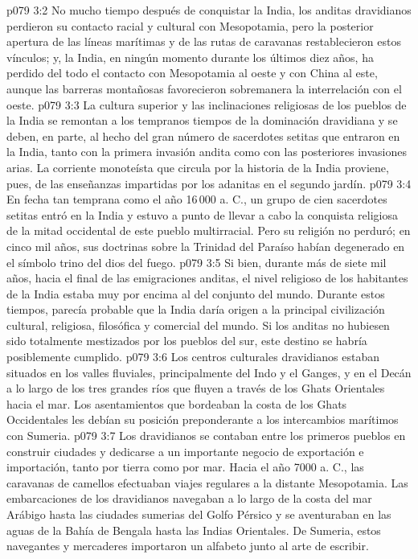 \vs p079 3:2 No mucho tiempo después de conquistar la India, los anditas dravidianos perdieron su contacto racial y cultural con Mesopotamia, pero la posterior apertura de las líneas marítimas y de las rutas de caravanas restablecieron estos vínculos; y, la India, en ningún momento durante los últimos diez años, ha perdido del todo el contacto con Mesopotamia al oeste y con China al este, aunque las barreras montañosas favorecieron sobremanera la interrelación con el oeste.
\vs p079 3:3 \pc La cultura superior y las inclinaciones religiosas de los pueblos de la India se remontan a los tempranos tiempos de la dominación dravidiana y se deben, en parte, al hecho del gran número de sacerdotes setitas que entraron en la India, tanto con la primera invasión andita como con las posteriores invasiones arias. La corriente monoteísta que circula por la historia de la India proviene, pues, de las enseñanzas impartidas por los adanitas en el segundo jardín.
\vs p079 3:4 En fecha tan temprana como el año 16\,000 a. C., un grupo de cien sacerdotes setitas entró en la India y estuvo a punto de llevar a cabo la conquista religiosa de la mitad occidental de este pueblo multirracial. Pero su religión no perduró; en cinco mil años, sus doctrinas sobre la Trinidad del Paraíso habían degenerado en el símbolo trino del dios del fuego.
\vs p079 3:5 Si bien, durante más de siete mil años, hacia el final de las emigraciones anditas, el nivel religioso de los habitantes de la India estaba muy por encima al del conjunto del mundo. Durante estos tiempos, parecía probable que la India daría origen a la principal civilización cultural, religiosa, filosófica y comercial del mundo. Si los anditas no hubiesen sido totalmente mestizados por los pueblos del sur, este destino se habría posiblemente cumplido.
\vs p079 3:6 \pc Los centros culturales dravidianos estaban situados en los valles fluviales, principalmente del Indo y el Ganges, y en el Decán a lo largo de los tres grandes ríos que fluyen a través de los Ghats Orientales hacia el mar. Los asentamientos que bordeaban la costa de los Ghats Occidentales les debían su posición preponderante a los intercambios marítimos con Sumeria.
\vs p079 3:7 Los dravidianos se contaban entre los primeros pueblos en construir ciudades y dedicarse a un importante negocio de exportación e importación, tanto por tierra como por mar. Hacia el año 7000 a. C., las caravanas de camellos efectuaban viajes regulares a la distante Mesopotamia. Las embarcaciones de los dravidianos navegaban a lo largo de la costa del mar Arábigo hasta las ciudades sumerias del Golfo Pérsico y se aventuraban en las aguas de la Bahía de Bengala hasta las Indias Orientales. De Sumeria, estos navegantes y mercaderes importaron un alfabeto junto al arte de escribir.
